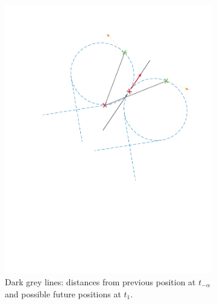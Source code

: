 \begin{itemize}
\begin{figure}[!htbp]
    \begin{subfigure}[b]{0.45\textwidth}
        \includegraphics[width=\textwidth]{img/circular_movment7.pdf}
        \caption{Dark grey lines: distances from previous position at $t_{-\alpha}$ and possible future positions at $t_1$. }
        \label{fig:seven}
   \end{subfigure}\hfill
    \begin{subfigure}[b]{0.45\textwidth}

\end{subfigure}
\end{figure}
\end{itemize}
